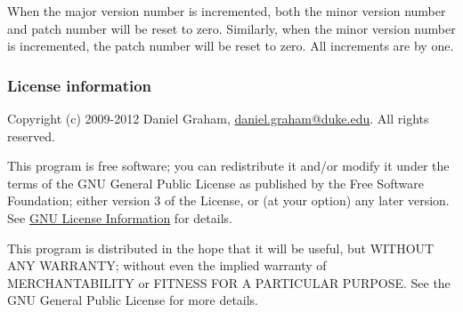 \documentclass[]{article}
\begin{document}
When the major version number is incremented, both the minor version
number and patch number will be reset to zero. Similarly, when the minor
version number is incremented, the patch number will be reset to zero.
All increments are by one.

\subsubsection{License information}

Copyright (c) 2009-2012 Daniel Graham,
\href{mailto:daniel.graham@duke.edu}{daniel.graham@duke.edu}. All rights
reserved.

This program is free software; you can redistribute it and/or modify it
under the terms of the GNU General Public License as published by the
Free Software Foundation; either version 3 of the License, or (at your
option) any later version. See
\href{http://www.gnu.org/licenses/gpl.html}{GNU License Information} for
details.

This program is distributed in the hope that it will be useful, but
WITHOUT ANY WARRANTY; without even the implied warranty of
MERCHANTABILITY or FITNESS FOR A PARTICULAR PURPOSE. See the GNU General
Public License for more details.
\end{document}
